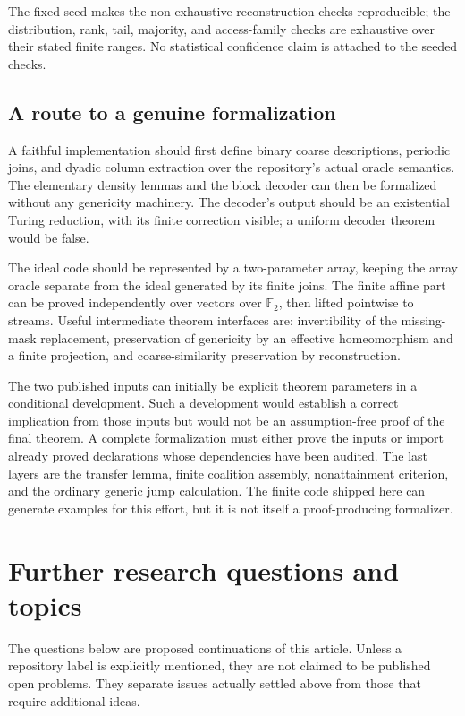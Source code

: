 \documentclass[11pt,letterpaper]{article}
\theoremstyle{plain}
\theoremstyle{definition}
\theoremstyle{remark}
\numberwithin{equation}{section}
\begin{document}
The fixed seed makes the non-exhaustive reconstruction checks reproducible;
the distribution, rank, tail, majority, and access-family checks are
exhaustive over their stated finite ranges. No statistical confidence
claim is attached to the seeded checks.

\subsection{A route to a genuine formalization}\label{cr11:sec:route}

A faithful implementation should first define binary coarse descriptions,
periodic joins, and dyadic column extraction over the repository's actual
oracle semantics. The elementary density lemmas and the block decoder can
then be formalized without any genericity machinery. The decoder's output
should be an existential Turing reduction, with its finite correction
visible; a uniform decoder theorem would be false.

The ideal code should be represented by a two-parameter array, keeping the
array oracle separate from the ideal generated by its finite joins. The
finite affine part can be proved independently over vectors over
$\mathbb F_2$, then lifted pointwise to streams. Useful intermediate theorem
interfaces are: invertibility of the missing-mask replacement, preservation
of genericity by an effective homeomorphism and a finite projection, and
coarse-similarity preservation by reconstruction.

The two published inputs can initially be explicit theorem parameters in a
conditional development. Such a development would establish a correct
implication from those inputs but would not be an assumption-free proof of
the final theorem. A complete formalization must either prove the inputs or
import already proved declarations whose dependencies have been audited.
The last layers are the transfer lemma, finite coalition assembly,
nonattainment criterion, and the ordinary generic jump calculation. The
finite code shipped here can generate examples for this effort, but it is
not itself a proof-producing formalizer.

\section{Further research questions and topics}\label{cr11:sec:questions}

The questions below are proposed continuations of this article. Unless a
repository label is explicitly mentioned, they are not claimed to be
published open problems. They separate issues actually settled above from
those that require additional ideas.
\end{document}
